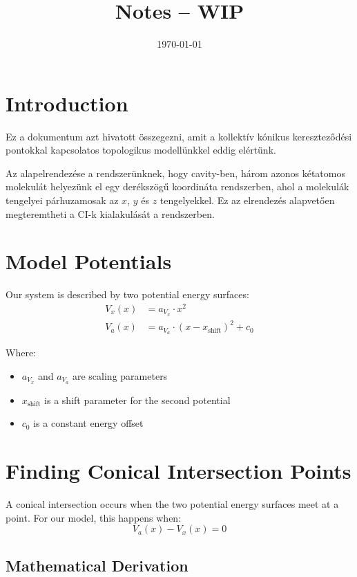 \documentclass{article}
\title{Notes -- WIP}
\date{\today}
\begin{document}
\maketitle

\section{Introduction}

Ez a dokumentum azt hivatott összegezni, amit a kollektív kónikus kereszteződési pontokkal kapcsolatos topologikus modellünkkel eddig elértünk.

Az alapelrendezése a rendszerünknek, hogy cavity-ben, három azonos kétatomos molekulát helyezünk el egy derékszögű koordináta rendszerben, ahol a molekulák tengelyei párhuzamosak az $x$, $y$ és $z$ tengelyekkel. Ez az elrendezés alapvetően megteremtheti a CI-k kialakulását a rendszerben.

\section{Model Potentials}

Our system is described by two potential energy surfaces:
\begin{align}
V_x(x) &= a_{V_x} \cdot x^2 \\
V_a(x) &= a_{V_a} \cdot (x - x_{\text{shift}})^2 + c_0
\end{align}

Where:
\begin{itemize}
    \item $a_{V_x}$ and $a_{V_a}$ are scaling parameters
    \item $x_{\text{shift}}$ is a shift parameter for the second potential
    \item $c_0$ is a constant energy offset
\end{itemize}

\section{Finding Conical Intersection Points}

A conical intersection occurs when the two potential energy surfaces meet at a point. For our model, this happens when:
\begin{equation}
V_a(x) - V_x(x) = 0
\end{equation}

\subsection{Mathematical Derivation}
\end{document}

